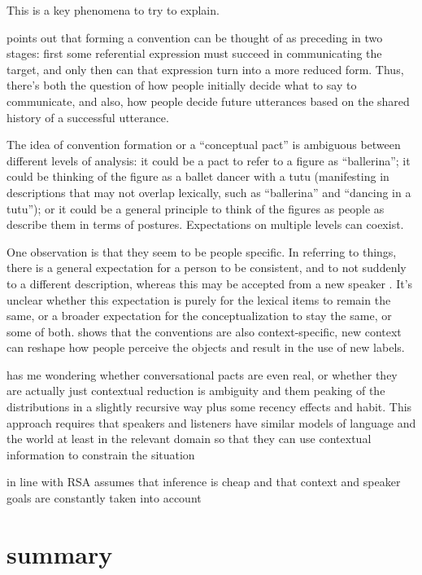 \documentclass[]{article}
\begin{document}
This is a key phenomena to try to explain. 

\cite{leung2023} points out that forming a convention can be thought of as preceding in two stages: first some referential expression must succeed in communicating the target, and only then can that expression turn into a more reduced form. Thus, there's both the question of how people initially decide what to say to communicate, and also, how people decide future utterances based on the shared history of a successful utterance. 

The idea of convention formation or a ``conceptual pact'' is ambiguous between different levels of analysis: it could be a pact to refer to a figure as ``ballerina''; it could be thinking of the figure as a ballet dancer with a tutu (manifesting in descriptions that may not overlap lexically, such as ``ballerina'' and ``dancing in a tutu''); or it could be a general principle to think of the figures as people as describe them in terms of postures. Expectations on multiple levels can coexist. 


One observation is that they seem to be people specific. In referring to things, there is a general expectation for a person to be consistent, and to not suddenly to a different description, whereas this may be accepted from a new speaker \cite{metzing2003a}. It's unclear whether this expectation is purely for the lexical items to remain the same, or a broader expectation for the conceptualization to stay the same, or some of both. \cite{ibarra2016} shows that the conventions are also context-specific, new context can reshape how people perceive the objects and result in the use of new labels. 


\cite{piantadosi2012} has me wondering whether conversational pacts are even real, or whether they are actually just contextual reduction is ambiguity and them peaking of the distributions in a slightly recursive way plus some recency effects and habit. This approach requires that speakers and listeners have similar models of language and the world at least in the relevant domain so that they can use contextual information to constrain the situation 

\cite{piantadosi2012} in line with RSA assumes that inference is cheap and that context and speaker goals are constantly taken into account 

\section{summary}
\end{document}
